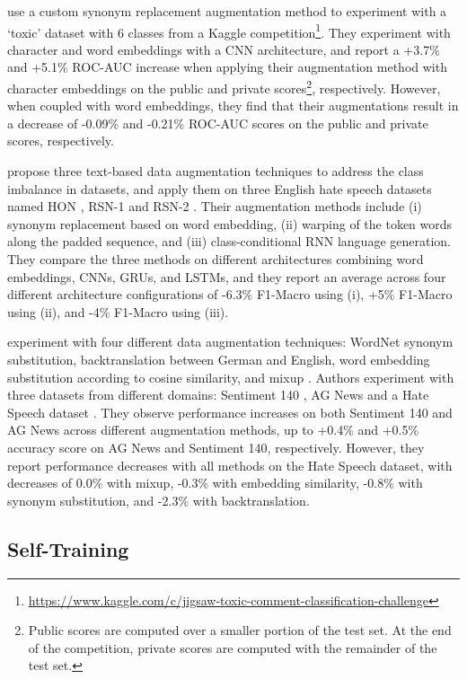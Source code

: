 \documentclass[11pt,a4paper]{article}
\begin{document}
\citet{mosolova2018text} use a custom synonym replacement augmentation method to experiment with a `toxic' dataset with 6 classes from a Kaggle competition\footnote{\url{https://www.kaggle.com/c/jigsaw-toxic-comment-classification-challenge}}. They experiment with character and word embeddings with a CNN architecture, and report a +3.7\% and +5.1\% ROC-AUC increase when applying their augmentation method with character embeddings on the public and private scores\footnote{Public scores are computed over a smaller portion of the test set. At the end of the competition, private scores are computed with the remainder of the test set.}, respectively. However, when coupled with word embeddings, they find that their augmentations result in a decrease of -0.09\% and -0.21\% ROC-AUC scores on the public and private scores, respectively.

\citet{10.1145/3357384.3358040} propose three text-based data augmentation techniques to address the class imbalance in datasets, and apply them on three English hate speech datasets named HON \cite{davidson2017automated}, RSN-1 \cite{waseemhovyhate} and RSN-2 \cite{waseem-2016-racist}. Their augmentation methods include (i) synonym replacement based on word embedding, (ii) warping of the token words along the padded sequence, and (iii) class-conditional RNN language generation. They compare the three methods on different architectures combining word embeddings, CNNs, GRUs, and LSTMs, and they report an average across four different architecture configurations of -6.3\% F1-Macro using (i), +5\% F1-Macro using (ii), and -4\% F1-Macro using (iii).

\citet{marivate2020improving} experiment with four different data augmentation techniques: WordNet synonym substitution, backtranslation between German and English, word embedding substitution according to cosine similarity, and mixup \cite{zhang2018mixup}.
Authors experiment with three datasets from different domains: Sentiment 140 \cite{go2009twitter}, AG News \cite{NIPS2015_250cf8b5} and a Hate Speech dataset \cite{davidson2017automated}. They observe performance increases on both Sentiment 140 and AG News across different augmentation methods, up to +0.4\% and +0.5\% accuracy score on AG News and Sentiment 140, respectively. However, they report performance decreases with all methods on the Hate Speech dataset, with decreases of 0.0\% with mixup, -0.3\% with embedding similarity, -0.8\% with synonym substitution, and -2.3\% with backtranslation. 


\subsection{Self-Training}
\end{document}
